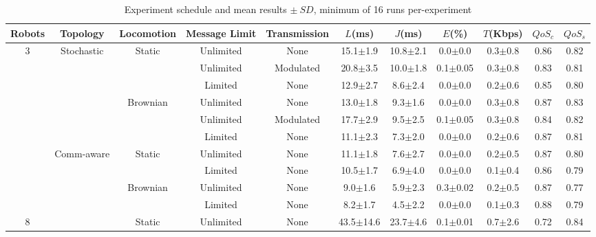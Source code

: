 \documentclass[conference]{IEEEtran}
\begin{document}
\renewcommand{\arraystretch}{0.9}  
\begin{table}[ht]
\scriptsize
\centering
\caption{Experiment schedule and mean results $\pm~SD$, minimum of 16 runs per-experiment}
\label{tab:exp_config}
\begin{tabular}{c|c|c|c|c|c|c|c|c|c|c}
\toprule
\textbf{Robots} & \textbf{Topology} & \textbf{Locomotion} & \textbf{Message Limit} & \textbf{Transmission} & \textbf{$L$(ms)} & \textbf{$J$(ms)} & \textbf{$E$(\%)} & \textbf{$T$(Kbps)} & \textbf{$QoS_c$} & \textbf{$QoS_s$} \\
\midrule
\multirow{10}{*}{3}
  & \multirow{5}{*}{Stochastic}
    & \multirow{2}{*}{Static}
                 & Unlimited & None      & 15.1$\pm$1.9 & 10.8$\pm$2.1 & 0.0$\pm$0.0 & 0.3$\pm$0.8 & 0.86 & 0.82 \\
  &   &          & Unlimited & Modulated & 20.8$\pm$3.5 & 10.0$\pm$1.8 & 0.1$\pm$0.05 & 0.3$\pm$0.8 & 0.83 & 0.81 \\
  &   &          & Limited   & None      & 12.9$\pm$2.7 & 8.6$\pm$2.4  & 0.0$\pm$0.0 & 0.2$\pm$0.6 & 0.85 & 0.80 \\
  \cmidrule{3-11}
  &   & \multirow{2}{*}{Brownian}
                 & Unlimited & None      & 13.0$\pm$1.8 & 9.3$\pm$1.6 & 0.0$\pm$0.0 & 0.3$\pm$0.8 & 0.87 & 0.83 \\
  &   &          & Unlimited & Modulated & 17.7$\pm$2.9 & 9.5$\pm$2.5 & 0.1$\pm$0.05 & 0.3$\pm$0.8 & 0.84 & 0.82 \\
  &   &          & Limited   & None      & 11.1$\pm$2.3 & 7.3$\pm$2.0 & 0.0$\pm$0.0 & 0.2$\pm$0.6 & 0.87 & 0.81 \\
  \cmidrule{2-11}
  & \multirow{5}{*}{Comm-aware}
    & \multirow{2}{*}{Static}
                 & Unlimited & None      & 11.1$\pm$1.8 & 7.6$\pm$2.7 & 0.0$\pm$0.0 & 0.2$\pm$0.5 & 0.87 & 0.80 \\
  &   &          & Limited   & None      & 10.5$\pm$1.7 & 6.9$\pm$4.0 & 0.0$\pm$0.0 & 0.1$\pm$0.4 & 0.86 & 0.79 \\
  \cmidrule{3-11}
  &   & \multirow{2}{*}{Brownian}
                 & Unlimited & None      & 9.0$\pm$1.6 & 5.9$\pm$2.3 & 0.3$\pm$0.02 & 0.2$\pm$0.5 & 0.87 & 0.77 \\
  &   &          & Limited   & None      & 8.2$\pm$1.7 & 4.5$\pm$2.2 & 0.0$\pm$0.0 & 0.1$\pm$0.3 & 0.88 & 0.79 \\
\midrule
\multirow{10}{*}{8}
  & \multirow{5}{*}{Stochastic}
    & \multirow{2}{*}{Static}
                 & Unlimited & None      & 43.5$\pm$14.6 & 23.7$\pm$4.6 & 0.1$\pm$0.01 & 0.7$\pm$2.6 & 0.72 & 0.84 \\

\end{tabular}
\end{table}
\end{document}
